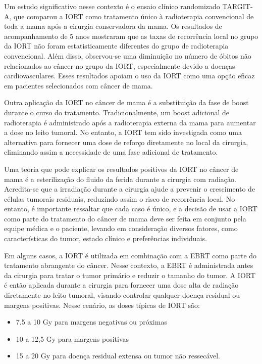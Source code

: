 \documentclass[11pt,a4paper]{article}
\begin{document}
	Um estudo significativo nesse contexto é o ensaio clínico randomizado TARGIT-A, que comparou a IORT como tratamento único à radioterapia convencional de toda a mama após a cirurgia conservadora da mama. Os resultados de acompanhamento de 5 anos mostraram que as taxas de recorrência local no grupo da IORT não foram estatisticamente diferentes do grupo de radioterapia convencional. Além disso, observou-se uma diminuição no número de óbitos não relacionados ao câncer no grupo da IORT, especialmente devido a doenças cardiovasculares. Esses resultados apoiam o uso da IORT como uma opção eficaz em pacientes selecionados com câncer de mama.

	Outra aplicação da IORT no câncer de mama é a substituição da fase de boost durante o curso do tratamento. Tradicionalmente, um boost adicional de radioterapia é administrado após a radioterapia externa da mama para aumentar a dose no leito tumoral. No entanto, a IORT tem sido investigada como uma alternativa para fornecer uma dose de reforço diretamente no local da cirurgia, eliminando assim a necessidade de uma fase adicional de tratamento.

	Uma teoria que pode explicar os resultados positivos da IORT no câncer de mama é a esterilização do fluido da ferida durante a cirurgia com radiação. Acredita-se que a irradiação durante a cirurgia ajude a prevenir o crescimento de células tumorais residuais, reduzindo assim o risco de recorrência local. No entanto, é importante ressaltar que cada caso é único, e a decisão de usar a IORT como parte do tratamento do câncer de mama deve ser feita em conjunto pela equipe médica e o paciente, levando em consideração diversos fatores, como características do tumor, estado clínico e preferências individuais.

	Em alguns casos, a IORT é utilizada em combinação com a EBRT como parte do tratamento abrangente do câncer. Nesse contexto, a EBRT é administrada antes da cirurgia para tratar o tumor primário e reduzir o tamanho do tumor. A IORT é então aplicada durante a cirurgia para fornecer uma dose alta de radiação diretamente no leito tumoral, visando controlar qualquer doença residual ou margens positivas. Nesse cenário, as doses típicas de IORT são:

	\begin{itemize}
		\item 7.5 a 10 Gy para margens negativas ou próximas
		\item 10 a 12,5 Gy para margens positivas
		\item 15 a 20 Gy para doença residual extensa ou tumor não ressecável.
	\end{itemize}
\end{document}
